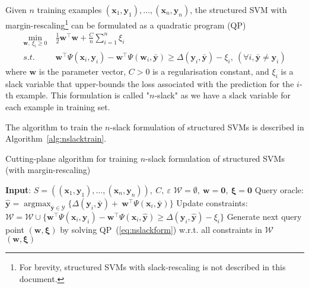 \documentclass[10pt,a4paper]{article}
\DeclareMathOperator*{\argmax}{argmax}
\newcommand{\eat}[1]{}
\begin{document}
Given $n$ training examples $(\mathbf{x}_1, \mathbf{y}_1), \dots, (\mathbf{x}_n, \mathbf{y}_n)$, 
the structured SVM with margin-rescaling\footnote{For brevity, structured SVMs with slack-rescaling is not described in this document.}
can be formulated as a quadratic program (QP)
\begin{equation}
\label{eq:nslackform}
\begin{aligned}
\min_{\mathbf{w}, ~\xi_i \ge 0} ~& \frac{1}{2} \mathbf{w}^\top \mathbf{w} + \frac{C}{n} \sum_{i=1}^n \xi_i \\
s.t.~~ ~& \mathbf{w}^\top \Psi(\mathbf{x}_i, \mathbf{y}_i) - \mathbf{w}^\top \Psi(\mathbf{w}_i, \bar{\mathbf{y}}) \ge 
       \Delta(\mathbf{y}_i, \bar{\mathbf{y}}) - \xi_i, ~(\forall i, \bar{\mathbf{y}} \neq \mathbf{y}_i)
\end{aligned}
\end{equation}
where $\mathbf{w}$ is the parameter vector, $C > 0$ is a regularisation constant, and $\xi_i$ is a slack variable that 
upper-bounds the loss associated with the prediction for the $i$-th example.
This formulation is called "$n$-slack" as we have a slack variable for each example in training set. \eat{citation}

The algorithm to train the $n$-slack formulation of structured SVMs is described in Algorithm~\ref{alg:nslacktrain}.

\begin{algorithm}[htbp]
\caption{Cutting-plane algorithm for training $n$-slack formulation of structured SVMs (with margin-rescaling)}
\label{alg:nslacktrain}
\begin{algorithmic}[1]
\STATE \textbf{Input}: $S = \left( (\mathbf{x}_1, \mathbf{y}_1), \dots, (\mathbf{x}_n, \mathbf{y}_n) \right),~ C,~ \varepsilon$
\STATE $\mathcal{W} = \emptyset,~ \mathbf{w} = \mathbf{0},~ \bm{\xi} = \mathbf{0}$
\REPEAT
        \STATE Query oracle: $\hat{\mathbf{y}} = \argmax_{\bar{\mathbf{y}} \in \mathcal{Y}} \{ \Delta(\mathbf{y}_i, \bar{\mathbf{y}}) + \
               \mathbf{w}^\top \Psi(\mathbf{x}_i, \bar{\mathbf{y}}) \}$
        \IF{$~\mathbf{w}^\top \Psi(\mathbf{x}_i, \mathbf{y}_i) - \mathbf{w}^\top \Psi(\mathbf{x}_i, \hat{\mathbf{y}}) + \varepsilon < 
            \Delta(\mathbf{y}_i, \hat{\mathbf{y}}) - \xi_i~$}
            \STATE Update constraints: $\mathcal{W} = \mathcal{W} \cup 
                   \{\mathbf{w}^\top \Psi(\mathbf{x}_i, \mathbf{y}_i) - \mathbf{w}^\top \Psi(\mathbf{x}_i, \hat{\mathbf{y}}) \ge 
                   \Delta(\mathbf{y}_i, \hat{\mathbf{y}}) - \xi_i \}$
            \STATE Generate next query point $(\mathbf{w}, \bm{\xi})$ by solving QP~(\ref{eq:nslackform}) w.r.t. all constraints in $\mathcal{W}$
        \ENDIF
    \ENDFOR
{}
\RETURN $(\mathbf{w}, \bm{\xi})$
\end{algorithmic}
\end{algorithm}
\end{document}
